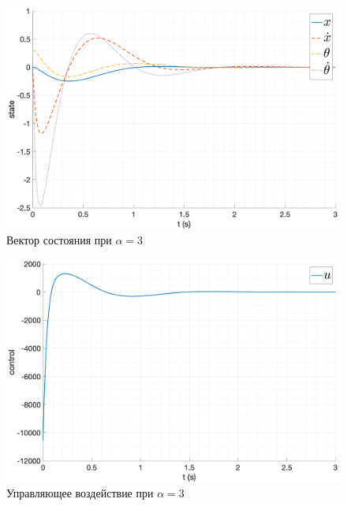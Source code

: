 \begin{figure}[ht!]
    \centering
    \includegraphics[width=\textwidth]{media/plots/nonmodal_controllers/state_2.png}
    \caption{Вектор состояния при $\alpha = 3$}
    \label{fig:nonmodal_control_alpha_2_u}
\end{figure}
\begin{figure}[ht!]
    \centering
    \includegraphics[width=\textwidth]{media/plots/nonmodal_controllers/u_2.png}
    \caption{Управляющее воздействие при $\alpha = 3$}
    \label{fig:nonmodal_control_alpha_2_u}
\end{figure}
